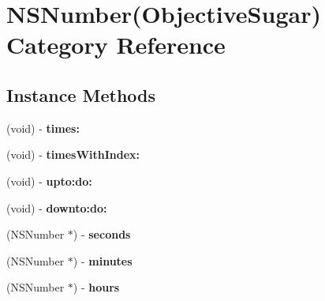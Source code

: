 \hypertarget{category_n_s_number_07_objective_sugar_08}{}\section{N\+S\+Number(Objective\+Sugar) Category Reference}
\label{category_n_s_number_07_objective_sugar_08}
\subsection*{Instance Methods}
\begin{DoxyCompactItemize}
\item 
\hypertarget{category_n_s_number_07_objective_sugar_08_a3e455d5dc4b933f5de5791d9a112f8d6}{}(void) -\/ {\bfseries times\+:}\label{category_n_s_number_07_objective_sugar_08_a3e455d5dc4b933f5de5791d9a112f8d6}

\item 
\hypertarget{category_n_s_number_07_objective_sugar_08_a421a4af896575c4919d033d10b1da6a9}{}(void) -\/ {\bfseries times\+With\+Index\+:}\label{category_n_s_number_07_objective_sugar_08_a421a4af896575c4919d033d10b1da6a9}

\item 
\hypertarget{category_n_s_number_07_objective_sugar_08_a510218cff72fc9231af218f36450fd88}{}(void) -\/ {\bfseries upto\+:do\+:}\label{category_n_s_number_07_objective_sugar_08_a510218cff72fc9231af218f36450fd88}

\item 
\hypertarget{category_n_s_number_07_objective_sugar_08_a50d3c6ee94edf7032af2e95775e5a30f}{}(void) -\/ {\bfseries downto\+:do\+:}\label{category_n_s_number_07_objective_sugar_08_a50d3c6ee94edf7032af2e95775e5a30f}

\item 
\hypertarget{category_n_s_number_07_objective_sugar_08_abe6a2532016e561cac3ab30731fc26e0}{}(N\+S\+Number $\ast$) -\/ {\bfseries seconds}\label{category_n_s_number_07_objective_sugar_08_abe6a2532016e561cac3ab30731fc26e0}

\item 
\hypertarget{category_n_s_number_07_objective_sugar_08_a3816444f37809127de175f3b32dca8db}{}(N\+S\+Number $\ast$) -\/ {\bfseries minutes}\label{category_n_s_number_07_objective_sugar_08_a3816444f37809127de175f3b32dca8db}

\item 
\hypertarget{category_n_s_number_07_objective_sugar_08_aa6989574cd2bf2691613a92f74cb2314}{}(N\+S\+Number $\ast$) -\/ {\bfseries hours}\label{category_n_s_number_07_objective_sugar_08_aa6989574cd2bf2691613a92f74cb2314}


\end{DoxyCompactItemize}
